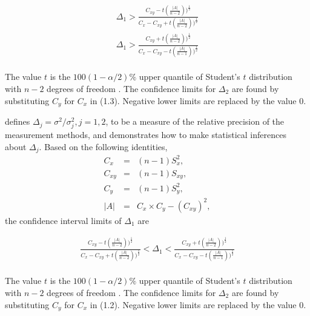 \documentclass[12pt, a4paper]{report}
\theoremstyle{plain}
\theoremstyle{definition}
\theoremstyle{remark}
\begin{document}
		\begin{eqnarray}
		\Delta_{1} > \frac{C_{xy}-
			t(\frac{|A|}{n-2}))^{\frac{1}{2}}}{C_{x}-C_{xy}+
			t(\frac{|A|}{n-2}))^{\frac{1}{2}}} \\
		\Delta_{1} > \frac{C_{xy}+
			t(\frac{|A|}{n-2}))^{\frac{1}{2}}}{C_{x}-C_{xy}-
			t(\frac{|A|}{n-1}))^{\frac{1}{2}}} \nonumber
		\end{eqnarray}
		\\ The value $t$ is the $100(1-\alpha/2)\%$ upper quantile of
		Student's $t$ distribution with $n-2$ degrees of freedom
		\citep{Kinsella}. The confidence limits for $\Delta_{2}$ are found by substituting $C_{y}$ for $C_{x}$ in (1.3).
		Negative lower limits are replaced by the value $0$.
		
		
		
			
	\citet{Thompson} defines $\Delta_j = \sigma^2 / \sigma^2_j, j=1,2$, to be a measure of the
	relative precision of the measurement methods, and demonstrates how to make statistical inferences about $\Delta_{j}$.
	Based on the following identities,
	\begin{eqnarray*}
		C_{x}&=&(n-1)S^2_{x},\nonumber\\
		C_{xy}&=&(n-1)S_{xy},\nonumber\\
		C_{y}&=&(n-1)S^2_{y},\nonumber\\
		|A| &=& C_{x}\times C_{y} - (C_{xy})^2,\nonumber
	\end{eqnarray*}
	\noindent the confidence interval limits of $\Delta_{1}$ are
	
	\begin{eqnarray}
	\frac{C_{xy}-
		t(\frac{|A|}{n-2}))^{\frac{1}{2}}}{C_{x}-C_{xy}+
		t(\frac{|A|}{n-2}))^{\frac{1}{2}}} <
	\Delta_{1} < \frac{C_{xy}+
		t(\frac{|A|}{n-2}))^{\frac{1}{2}}}{C_{x}-C_{xy}-
		t(\frac{|A|}{n-1}))^{\frac{1}{2}}} \nonumber
	\end{eqnarray}
	\\ The value $t$ is the $100(1-\alpha/2)\%$ upper quantile of
	Student's $t$ distribution with $n-2$ degrees of freedom
	\citep{Kinsella}. The confidence limits for $\Delta_{2}$ are found by substituting $C_{y}$ for $C_{x}$ in (1.2).
	Negative lower limits are replaced by the value $0$.
	
\end{document}
